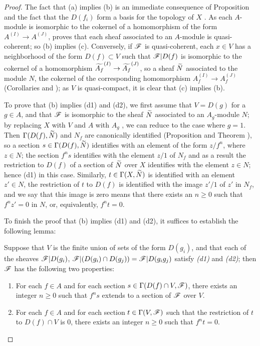 \begin{proof}
\label{proof-1.1.4.1}
The fact that (a) implies (b) is an immediate consequence of Proposition  and the fact
that the $D(f_i)$ form a basis for the topology of $X$ . As each
$A$-module is isomorphic to the cokernel of a homomorphism of the form $A^{(I)}\to A^{(J)}$,
 proves that each sheaf associated to an $A$-module is quasi-coherent; so
(b) implies (c). Conversely, if $\mathscr{F}$ is quasi-coherent, each $x\in V$ has a neighborhood
of the form $D(f)\subset V$ such that $\mathscr{F}|D(f)$ is isomorphic to the cokernel of a
homomorphism $\widetilde{A_f}^{(I)}\to\widetilde{A_f}^{(J)}$, so a sheaf $\widetilde{N}$
associated to the module $N$, the cokernel of the corresponding homomorphism
$A_f^{(I)}\to A_f^{(J)}$ (Corollaries  and ); as $V$ is quasi-compact,
it is clear that (c) implies (b).

To prove that (b) implies (d1) and (d2), we first assume that $V=D(g)$ for a $g\in A$, and
that $\mathscr{F}$ is isomorphic to the sheaf $\widetilde{N}$ associated to an $A_g$-module $N$;
by replacing $X$ with $V$ and $A$ with $A_g$ , we can reduce to the case
where $g=1$. Then $\Gamma(D(f),\widetilde{N})$ and $N_f$ are canonically identified
(Proposition  and Theorem ), so a section $s\in\Gamma(D(f),\widetilde{N})$
identifies with an element of the form $z/f^n$, where $z\in N$; the section $f^n s$ identifies
with the element $z/1$ of $N_f$ and as a result the restriction to $D(f)$ of a section of
$\widetilde{N}$ over $X$ identifies with the element $z\in N$; hence (d1) in this case.
Similarly, $t\in\Gamma(X,\widetilde{N})$ is identified with an element $z'\in N$, the
restriction of $t$ to $D(f)$ is identified with the image $z'/1$ of $z'$ in $N_f$, and we say
that this image is zero means that there exists an $n\geqslant 0$ such that $f^n z'=0$ in
$N$, or, equivalently, $f^n t=0$.

To finish the proof that (b) implies (d1) and (d2), it suffices to establish the following
lemma:
\begin{lem}[1.4.1.1]
\label{1.1.4.1.1}
Suppose that $V$ is the finite union of sets of the form $D(g_i)$, and that each of the
sheaves $\mathscr{F}|D(g_i)$, $\mathscr{F}|(D(g_i)\cap D(g_j))=\mathscr{F}|D(g_i g_j)$ satisfy \emph{(d1)}
and \emph{(d2)}; then $\mathscr{F}$ has the following two properties:
\begin{enumerate}[label=\emph{(d$'$\arabic*)}]
  \item For each $f\in A$ and for each section $s\in\Gamma(D(f)\cap V,\mathscr{F})$, there exists
    an integer $n\geqslant 0$ such that $f^n s$ extends to a section of $\mathscr{F}$ over $V$.
  \item For each $f\in A$ and for each section $t\in\Gamma(V,\mathscr{F})$ such that the
    restriction of $t$ to $D(f)\cap V$ is $0$, there exists an integer $n\geqslant 0$ such that $f^n t=0$.
\end{enumerate}
\end{lem}


\end{proof}

